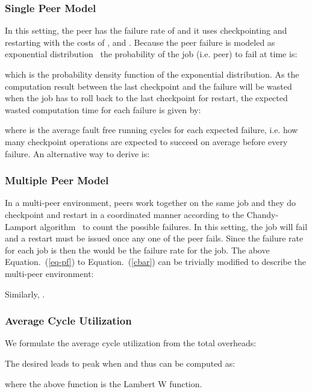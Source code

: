 \documentclass[times, 12pt, onecolumn]{article}
\newcommand{\refeq}[1]{Equation.~(\ref{#1})}
\begin{document}
\subsubsection{Single Peer Model}

In this setting, the peer has the failure rate of  and it uses
checkpointing and restarting with the costs of ,  and . Because
the peer failure is modeled as exponential distribution~\cite{tianjing07,
GhinitaT06} the probability of the job (i.e. peer) to fail at time  is:

which is the probability density function of the exponential distribution. As the computation result between the 
last checkpoint and the failure will be wasted when the job has to roll back to the last checkpoint for restart, 
the expected wasted computation time for each failure is given by:

where  is the average fault free running cycles for each expected
failure, i.e. how many checkpoint operations are expected to succeed on average
before every failure. An alternative way to derive  is:



\subsubsection{Multiple Peer Model} 

In a multi-peer environment,  peers work together on the same job and they do checkpoint and restart 
in a coordinated manner according to the Chandy-Lamport algorithm~\cite{ChandyL85} to count the possible failures. 
In this setting, the job will fail and a restart must be issued once any one of the  peer fails. Since the 
failure rate for each job is  then the  would be the failure rate for the job. The above \refeq{eq-pf} 
to \refeq{cbar} can be trivially modified to describe the multi-peer environment:


  


Similarly, .

\subsubsection{Average Cycle Utilization}

We formulate the average cycle utilization from the total overheads: 


The desired  leads  to peak when  and thus can be computed as:

where the above  function is the Lambert W function. 
\end{document}
